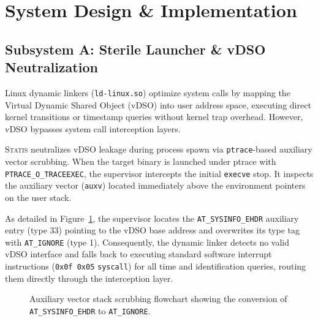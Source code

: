 \documentclass[twocolumn,10pt,sigconf,nonacm]{acmart}
\begin{document}
\section{System Design \& Implementation}

\subsection{Subsystem A: Sterile Launcher \& vDSO Neutralization}
Linux dynamic linkers (\texttt{ld-linux.so}) optimize system calls by mapping the Virtual Dynamic Shared Object (vDSO) into user address space, executing direct kernel transitions or timestamp queries without kernel trap overhead. However, vDSO bypasses system call interception layers.

\textsc{Statis} neutralizes vDSO leakage during process spawn via \texttt{ptrace}-based auxiliary vector scrubbing. When the target binary is launched under ptrace with \texttt{PTRACE\_O\_TRACEEXEC}, the supervisor intercepts the initial \texttt{execve} stop. It inspects the auxiliary vector (\texttt{auxv}) located immediately above the environment pointers on the user stack.

As detailed in Figure~\ref{fig:auxv_flow}, the supervisor locates the \texttt{AT\_SYSINFO\_EHDR} auxiliary entry (type 33) pointing to the vDSO base address and overwrites its type tag with \texttt{AT\_IGNORE} (type 1). Consequently, the dynamic linker detects no valid vDSO interface and falls back to executing standard software interrupt instructions (\texttt{0x0f 0x05} \texttt{syscall}) for all time and identification queries, routing them directly through the interception layer.

\begin{figure}[t]
\centering
{}
\caption{Auxiliary vector stack scrubbing flowchart showing the conversion of \texttt{AT\_SYSINFO\_EHDR} to \texttt{AT\_IGNORE}.}
\label{fig:auxv_flow}
\end{figure}
\end{document}
